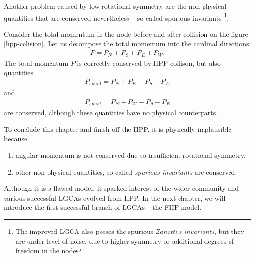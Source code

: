 \bigskip
Another problem caused by low rotational symmetry are the non-physical quantities that are conserved nevertheless -- so called spurious invariants \footnote{The improved LGCA also posses the spurious \textit{Zanetti's invariants}, but they are under level of noise, due to higher symmetry or additional degrees of freedom in the node}.

Consider the total momentum in the node before and after collision on the figure \ref{hpp-colision}.
Let us decompose the total momentum into the cardinal directions:
\begin{align} 
P = P_N + P_S + P_E + P_W.
\end{align}
The total momentum $P$ is correctly conserved by HPP collison, but also quantities
\begin{align} \label{zanet}
P_{spur1} = P_N + P_E - P_S - P_W
\end{align}
and
\begin{align}
P_{spur2} = P_N + P_W - P_S - P_E
\end{align}
are conserved, although these quantities have no physical counterparts.

\bigskip


To conclude this chapter and finish-off the HPP, it is physically implausible because
\begin{enumerate}
\item angular momentum is not conserved due to insufficient rotational symmetry,
\item other non-physical quantities, so called \textit{spurious invariants} are conserved.
\end{enumerate}

Although it is a flawed model, it sparked interest of the wider community and various successful LGCAs evolved from HPP. In the next chapter, we will introduce the first successful branch of LGCAs -- the FHP model.